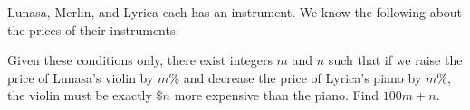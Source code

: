 Lunasa, Merlin, and Lyrica each has an instrument. We know the following about the prices of their instruments:

\begin{itemize}
\end{itemize}

Given these conditions only, there exist integers $m$ and $n$ such that if we raise the price of Lunasa's violin by $m\%$ and decrease the price of Lyrica's piano by $m\%$, the violin must be exactly $\$n$ more expensive than the piano. Find $100m+n$.
